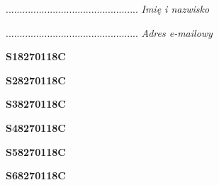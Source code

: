 \begin{turn}{90}\begin{minipage}{\linewidth} \vspace{20mm} ................................................  \textit{Imię i nazwisko}\end{minipage}\end{turn}

\begin{turn}{90}\begin{minipage}{\linewidth} \vspace{20mm} ................................................  \textit{Adres e-mailowy}\end{minipage}\end{turn}

\begin{turn}{90}\huge \begin{minipage}{\linewidth} \vspace{10mm}\textbf{S18270118C}\end{minipage}\end{turn}

\begin{turn}{90}\huge \begin{minipage}{\linewidth} \vspace{10mm}\textbf{S28270118C}\end{minipage}\end{turn}

\begin{turn}{90}\huge \begin{minipage}{\linewidth} \vspace{10mm}\textbf{S38270118C}\end{minipage}\end{turn}

\begin{turn}{90}\huge \begin{minipage}{\linewidth} \vspace{10mm}\textbf{S48270118C}\end{minipage}\end{turn}

\begin{turn}{90}\huge \begin{minipage}{\linewidth} \vspace{10mm}\textbf{S58270118C}\end{minipage}\end{turn}

\begin{turn}{90}\huge \begin{minipage}{\linewidth} \vspace{10mm}\textbf{S68270118C}\end{minipage}\end{turn}

